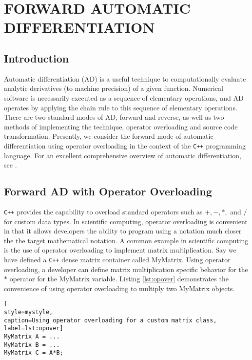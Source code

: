 \chapter{FORWARD AUTOMATIC DIFFERENTIATION}
\label{chap:fad}

\section{Introduction}

Automatic differentiation (AD) is a useful technique to computationally
evaluate analytic derivatives (to machine precision) of a given function.
Numerical software is necessarily executed as a sequence of elementary
operations, and AD operates by applying the chain rule to this sequence
of elementary operations. There are two standard modes of AD, forward and
reverse, as well as two methods of implementing the technique, operator
overloading and source code transformation. Presently, we consider the
forward mode of automatic differentiation using operator overloading in the
context of the \texttt{C++} programming language. For an excellent
comprehensive overview of automatic differentiation, see
\cite{griewank2008evaluating}.

\section{Forward AD with Operator Overloading}

\texttt{C++} provides the capability to overload standard operators such as
$+,-,*,$ and $/$ for custom data types. In scientific computing, operator
overloading is convenient in that it allows developers the ability to program
using a notation much closer the the target mathematical notation. A common
example in scientific computing is the use of operator overloading to implement
matrix multiplication. Say we have defined a \texttt{C++} dense matrix
container called MyMatrix. Using operator overloading, a developer can define
matrix multiplication specific behavior for the $*$ operator for the MyMatrix
variable. Listing \ref{lst:opover} demonstrates the convenience of using
operator overloading to multiply two MyMatrix objects.
%
\begin{lstlisting}[
style=mystyle,
caption=Using operator overloading for a custom matrix class,
label=lst:opover]
MyMatrix A = ...
MyMatrix B = ...
MyMatrix C = A*B;
\end{lstlisting}
%

